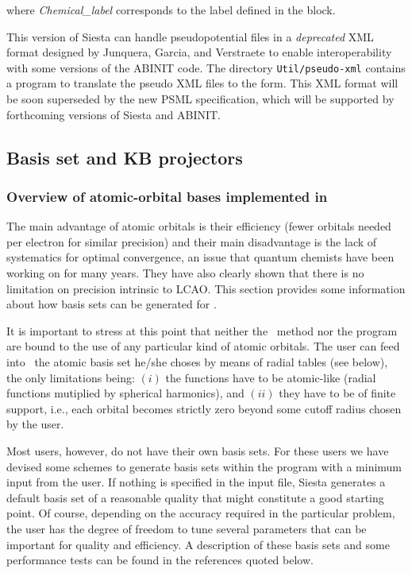 \noindent
where \textit{Chemical\_label} corresponds to the label defined in the
 block.

This version of Siesta can handle pseudopotential files in a
\textit{deprecated} XML format designed by Junquera, Garcia, and
Verstraete to enable interoperability with some versions of the
ABINIT code. The directory \texttt{Util/pseudo-xml} contains a program to
translate the pseudo XML files to the  form. This XML format
will be soon superseded by the new PSML specification, which will be
supported by forthcoming versions of Siesta and ABINIT.



\subsection{Basis set and KB projectors}

\subsubsection{Overview of atomic-orbital bases implemented in \texorpdfstring{\siesta}{SIESTA}}

The main advantage of atomic orbitals is their efficiency (fewer orbitals
needed per electron for similar precision)
and their main disadvantage is the lack of systematics for optimal
convergence, an issue that quantum chemists have been working on for
many years. They have also clearly shown that there
is no limitation on precision intrinsic to LCAO.
This section provides some information about how basis sets can be
generated for \siesta.

It is important to stress at this point that neither the \siesta\
method nor the program
are bound to the use of any particular kind of atomic orbitals. The
user can feed into \siesta\ the atomic basis set he/she choses by
means of radial tables (see \fdf{User.Basis} below), the
only limitations being: $(i)$ the functions have to be atomic-like (radial
functions mutiplied by spherical harmonics), and $(ii)$ they have to be
of finite support, i.e., each orbital becomes strictly zero beyond some
cutoff radius chosen by the user.

Most users, however, do not have their own basis sets. For these users
we have devised some schemes to generate basis sets within the program
with a minimum input from the user.  If nothing is specified in the
input file, Siesta generates a default basis set of a reasonable
quality that might constitute a good starting point.  Of course,
depending on the accuracy required in the particular problem, the user
has the degree of freedom to tune several parameters that can be
important for quality and efficiency. A description of these basis
sets and some performance tests can be found in the references quoted
below.

